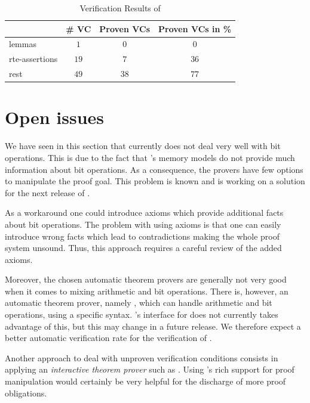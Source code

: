 \begin{table}[hbt]
  \centering
  \begin{tabular}[h]{lccc}
    \toprule
     & \# VC & Proven VCs & Proven VCs in \%\\
    \midrule
    lemmas & $1$ &$0$ & $0$ \\
    rte-assertions&$19$&$7$&$36$\\
    rest &$49$ &$38$&$77$\\
    \bottomrule
  \end{tabular}
  \caption{Verification Results of \poke}
  \label{tab:results-poke}
\end{table}

\clearpage

\section{Open issues}
\label{issues}



We have seen in this section that \wpframac currently does not deal very well with bit operations.
This is due to the fact that \wpframac's memory models do not provide 
much information about bit operations.
As a consequence, the provers have few options to manipulate the proof goal.
This problem is known and \cealist is working on a solution for the next release of \wpframac.

As a workaround one could introduce axioms which provide
additional facts about bit operations. 
The problem with using axioms is that one can easily introduce wrong facts
which lead to contradictions making the whole proof system unsound. 
Thus, this approach requires a careful review of the added axioms.

Moreover, the chosen automatic theorem provers are generally not very
good when it comes to mixing arithmetic and bit operations.
There is, however, an automatic theorem prover, namely \z,
which can handle arithmetic and bit operations, using a specific syntax.
\framac's interface for \z does not currently takes advantage of this, 
but this may change in a future release.
We therefore expect a better automatic verification rate for the verification of \bitwalker.

Another approach to deal with unproven verification conditions consists in
applying an \emph{interactive theorem prover} such as \coq.
Using \coq's rich support for proof manipulation would certainly be very helpful
for the discharge of more proof obligations.

